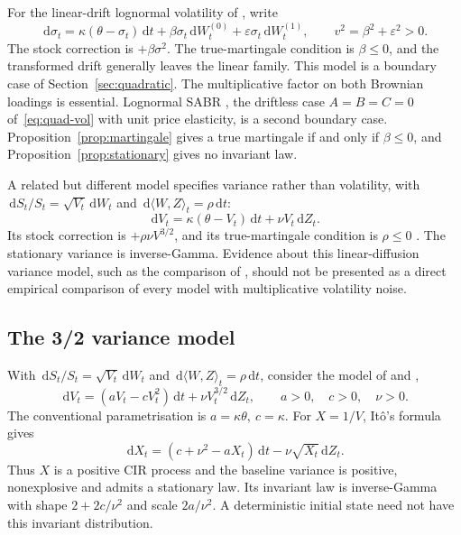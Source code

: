 \documentclass[11pt,a4paper]{article}
\theoremstyle{definition}
\theoremstyle{remark}
\newcommand{\dd}{\,\mathrm{d}}
\begin{document}
For the linear-drift lognormal volatility of \citet{KarasinskiSepp2012}, write
\begin{equation}
 \dd\sigma_t=\kappa(\theta-\sigma_t)\dd t+
 \beta\sigma_t\dd W_t^{(0)}+\varepsilon\sigma_t\dd W_t^{(1)},
 \qquad v^2=\beta^2+\varepsilon^2>0.
 \label{eq:linear-logsv}
\end{equation}
The stock correction is \(+\beta\sigma^2\). The true-martingale condition is \(\beta\leq0\), and the transformed drift generally leaves the linear family. This model is a boundary case of Section~\ref{sec:quadratic}. The multiplicative factor on both Brownian loadings is essential.
Lognormal SABR \citep{HaganEtAl2002}, the driftless case \(A=B=C=0\) of~\eqref{eq:quad-vol} with unit price elasticity, is a second boundary case. Proposition~\ref{prop:martingale} gives a true martingale if and only if \(\beta\leq0\), and Proposition~\ref{prop:stationary} gives no invariant law.

A related but different model specifies variance rather than volatility, with
\(\dd S_t/S_t=\sqrt{V_t}\dd W_t\) and \(\dd\langle W,Z\rangle_t=\rho\dd t\):
\begin{equation}
 \dd V_t=\kappa(\theta-V_t)\dd t+\nu V_t\dd Z_t.
 \label{eq:garch}
\end{equation}
Its stock correction is \(+\rho\nu V^{3/2}\), and its true-martingale condition is \(\rho\leq0\) \citep[Proposition~2.5]{AndersenPiterbarg2007}. The stationary variance is inverse-Gamma. Evidence about this linear-diffusion variance model, such as the comparison of \citet{ChristoffersenJacobsMimouni2010}, should not be presented as a direct empirical comparison of every model with multiplicative volatility noise.

\subsection{The 3/2 variance model}

With \(\dd S_t/S_t=\sqrt{V_t}\dd W_t\) and
\(\dd\langle W,Z\rangle_t=\rho\dd t\), consider the model of \citet{Lewis2000} and \citet{CarrSun2007},
\begin{equation}
 \dd V_t=(aV_t-cV_t^2)\dd t+\nu V_t^{3/2}\dd Z_t,
 \qquad a>0,\quad c>0,\quad \nu>0.
 \label{eq:threehalves}
\end{equation}
The conventional parametrisation is \(a=\kappa\theta,\ c=\kappa\).
For \(X=1/V\), It\^o's formula gives
\begin{equation}
 \dd X_t=(c+\nu^2-aX_t)\dd t-\nu\sqrt{X_t}\dd Z_t.
 \label{eq:reciprocal-cir}
\end{equation}
Thus \(X\) is a positive CIR process and the baseline variance is positive, nonexplosive and admits a stationary law. Its invariant law is inverse-Gamma with shape \(2+2c/\nu^2\) and scale \(2a/\nu^2\). A deterministic initial state need not have this invariant distribution.
\end{document}

